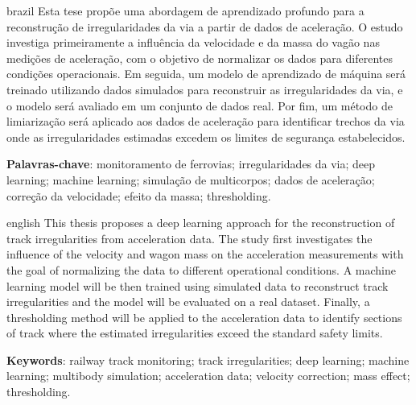 \setlength{\absparsep}{18pt} %
\begin{resumo}[Resumo]
 \begin{otherlanguage*}{brazil}
    Esta tese propõe uma abordagem de aprendizado profundo para a reconstrução de irregularidades da via a partir de dados de aceleração. O estudo investiga primeiramente a influência da velocidade e da massa do vagão nas medições de aceleração, com o objetivo de normalizar os dados para diferentes condições operacionais. Em seguida, um modelo de aprendizado de máquina será treinado utilizando dados simulados para reconstruir as irregularidades da via, e o modelo será avaliado em um conjunto de dados real. Por fim, um método de limiarização será aplicado aos dados de aceleração para identificar trechos da via onde as irregularidades estimadas excedem os limites de segurança estabelecidos.

    \textbf{Palavras-chave}: monitoramento de ferrovias; irregularidades da via; deep learning; machine learning; simulação de multicorpos; dados de aceleração; correção da velocidade; efeito da massa; thresholding.
 \end{otherlanguage*}
\end{resumo}
\begin{resumo}[Abstract]
 \begin{otherlanguage*}{english}
    This thesis proposes a deep learning approach for the reconstruction of track irregularities from acceleration data. The study first investigates the influence of the velocity and wagon mass on the acceleration measurements with the goal of normalizing the data to different operational conditions. A machine learning model will be then trained using simulated data to reconstruct track irregularities and the model will be evaluated on a real dataset. Finally, a thresholding method will be applied to the acceleration data to identify sections of track where the estimated irregularities exceed the standard safety limits.

    \textbf{Keywords}: railway track monitoring; track irregularities; deep learning; machine learning; multibody simulation; acceleration data; velocity correction; mass effect; thresholding.
 \end{otherlanguage*}
\end{resumo}
